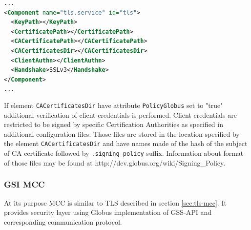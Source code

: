 \documentclass{article}
\makeatletter
\renewcommand\paragraph{\@startsection{paragraph}{4}{\z@}%
  {-3.25ex\@plus -1ex \@minus -.2ex}%
  {1.5ex \@plus .2ex}%
  {\normalfont\normalsize\bfseries}}
\makeatother
\begin{document}
\begin{lstlisting}[language=xml]
...
<Component name="tls.service" id="tls">
  <KeyPath></KeyPath>
  <CertificatePath></CertificatePath>
  <CACertificatePath></CACertificatePath>
  <CACertificatesDir></CACertificatesDir>
  <ClientAuthn></ClientAuthn>
  <Handshake>SSLv3</Handshake>
</Component>
...
\end{lstlisting}

If element \texttt{CACertificatesDir} have attribute \texttt{PolicyGlobus} set
to "true" additional verification of client credentials is performed. Client
credentials are restricted to be signed by specific Certification Authorities
as specified in additional configuration files. Those files are stored in the
location specified by the element \texttt{CACertificatesDir} and have names
made of the hash of the subject of CA certificate followed by \texttt{.signing\_policy}
suffix. Information about format of those files may be found at 
http://dev.globus.org/wiki/Signing\_Policy.

\subsubsection{GSI MCC}\label{sec:gsi-mcc}
At its purpose MCC is similar to TLS described in section \ref{sec:tls-mcc}. It 
provides security layer using Globus implementation of GSS-API and corresponding 
communication protocol.
\end{document}
